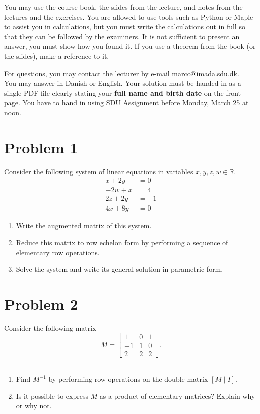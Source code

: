\documentclass[a4paper,10pt]{article}
\def\R{\mathbb R}
\begin{document}
You may use the course book, the slides from the lecture, and notes from
the lectures and the exercises. You are allowed to use tools such as
Python or Maple to assist you in calculations, but you must write the calculations out
in full so that they can be followed by the examiners.  It is not
sufficient to present an answer, you must show how you found it.  If you
use a theorem from the book (or the slides), make a reference to
it. \newline
\vspace{5mm}

For questions, you may contact the lecturer by e-mail
\url{marco@imada.sdu.dk}. \\ You may answer in Danish or English. Your
solution must be handed in as a single PDF file clearly stating your
{\bf full name and birth date} on the front page. You have to hand in
using SDU Assignment before Monday, March 25 at noon.





\newpage
\section*{Problem 1}
Consider the following system of linear equations in variables $x,y,z,w\in \R$.
\begin{align*}
x+2y&=0 \\
-2w+x&=4 \\
2z+2y&=-1 \\
4x+8y&=0
\end{align*}
\noindent
\begin{enumerate}
\item Write the augmented matrix of this system.
\item Reduce this matrix to row echelon form by performing a sequence of elementary row
operations.
\item Solve the system and write its general solution in parametric form.
\end{enumerate}


\section*{Problem 2}
Consider the following matrix
$$
M=\left[ \begin{array}{ccc} 1 & 0 & 1 \\ -1 & 1 & 0 \\ 2 & 2 & 2 \end{array} \right].
$$ \\
\noindent
\begin{enumerate}
\item Find $M^{-1}$ by performing row operations on the double
matrix $[M\; | \;I]$.
\item Is it possible to express $M$ as a product of elementary matrices? Explain why or why not.
\end{enumerate}
\end{document}
